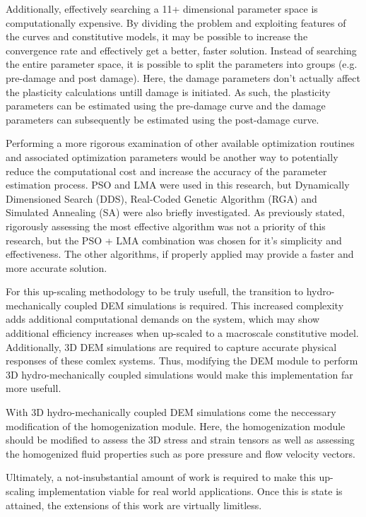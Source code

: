 Additionally, effectively searching a 11+ dimensional parameter space is computationally expensive. By dividing the problem and exploiting features of the curves and constitutive models, it may be possible to increase the convergence rate and effectively get a better, faster solution. Instead of searching the entire parameter space, it is possible to split the parameters into groups (e.g. pre-damage and post damage). Here, the damage parameters don't actually affect the plasticity calculations untill damage is initiated. As such, the plasticity parameters can be estimated using the pre-damage curve and the damage parameters can subsequently be estimated using the post-damage curve.

Performing a more rigorous examination of other available optimization routines and associated optimization parameters would be another way to potentially reduce the computational cost and increase the accuracy of the parameter estimation process. PSO and LMA were used in this research, but Dynamically Dimensioned Search (DDS), 
Real-Coded Genetic Algorithm (RGA) and Simulated Annealing (SA) were also briefly investigated. As previously stated, rigorously assessing the most effective algorithm was not a priority of this research, but the PSO + LMA combination was chosen for it's simplicity and effectiveness. The other algorithms, if properly applied may provide a faster and more accurate solution.
	
For this up-scaling methodology to be truly usefull, the transition to hydro-mechanically coupled DEM simulations is required. This increased complexity adds additional computational demands on the system, which may show additional efficiency increases when up-scaled to a macroscale constitutive model. Additionally, 3D DEM simulations are required to capture accurate physical responses of these comlex systems. Thus, modifying the DEM module to perform 3D hydro-mechanically coupled simulations would make this implementation far more usefull.  

With 3D hydro-mechanically coupled DEM simulations come the neccessary modification of the homogenization module. Here, the homogenization module should be modified to assess the 3D stress and strain tensors as well as assessing the homogenized fluid properties such as pore pressure and flow velocity vectors. 

Ultimately, a not-insubstantial amount of work is required to make this up-scaling implementation viable for real world applications. Once this is state is attained, the extensions of this work are virtually limitless.